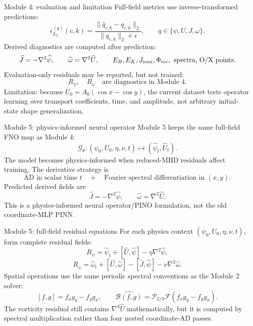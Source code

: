 \documentclass[aspectratio=169,11pt]{beamer}
\newcommand{\bracket}[2]{\left[#1,#2\right]}
\newcommand{\Rpsi}{R_{\psi}}
\newcommand{\Romega}{R_{\omega}}
\newcommand{\currentmodule}{Module 1}
\newcommand{\moduleprogress}{1 of 4}
\newcommand{\setmodule}[2]{%
  \renewcommand{\currentmodule}{#1}%
  \renewcommand{\moduleprogress}{#2}%
}
\begin{document}
\setmodule{Module 4}{4 of 4}
\begin{frame}[t]{Module 4: evaluation and limitation}
\vspace{-0.15em}
Full-field metrics use inverse-transformed predictions:
\[
\epsilon^{(q)}_{L_2}(c,k)=\frac{\|\widehat q_{c,k}-q_{c,k}\|_2}{\|q_{c,k}\|_2+\epsilon},
\qquad q\in\{\psi,U,J,\omega\}.
\]
Derived diagnostics are computed after prediction:
\[
\widehat J=-\nabla^2\widehat\psi,
\qquad
\widehat\omega=\nabla^2\widehat U,
\qquad
E_B,E_K,J_{\max},\Phi_{\rm rec},\text{ spectra, O/X points}.
\]
Evaluation-only residuals may be reported, but not trained:
\[
\Rpsi,\quad \Romega\quad\text{are diagnostics in Module 4.}
\]
Limitation: because $U_0=A_0(\cos x-\cos y)$, the current dataset tests operator learning over transport coefficients, time, and amplitude, not arbitrary initial-state shape generalization.
\end{frame}


\setmodule{Module 5}{1 of 4}
\begin{frame}[t]{Module 5: physics-informed neural operator}
\vspace{-0.15em}
Module 5 keeps the same full-field FNO map as Module 4:
\[
\mathcal G_\theta:(\psi_0,U_0,\eta,\nu,t)\mapsto(\widehat\psi_t,\widehat U_t).
\]
The model becomes physics-informed when reduced-MHD residuals affect training. The derivative strategy is
\[
\boxed{\text{AD in scalar time }t\quad+\quad\text{Fourier spectral differentiation in }(x,y).}
\]
Predicted derived fields are
\[
\widehat J=-\nabla^2\widehat\psi,
\qquad
\widehat\omega=\nabla^2\widehat U.
\]
This is a physics-informed neural operator/PINO formulation, not the old coordinate-MLP PINN.
\end{frame}

\setmodule{Module 5}{2 of 4}
\begin{frame}[t]{Module 5: full-field residual equations}
\vspace{-0.15em}
For each physics context $(\psi_0,U_0,\eta,\nu,t)$, form complete residual fields:
\[
\boxed{\Rpsi=\widehat\psi_t+\bracket{\widehat U}{\widehat\psi}-\eta\nabla^2\widehat\psi,}
\]
\[
\boxed{\Romega=\widehat\omega_t+\bracket{\widehat U}{\widehat\omega}
-\bracket{\widehat J}{\widehat\psi}-\nu\nabla^2\widehat\omega.}
\]
Spatial operations use the same periodic spectral conventions as the Module 2 solver:
\[
\bracket{f}{g}=f_xg_y-f_yg_x,
\qquad
\widehat{\mathcal B(f,g)}=\mathcal P_{2/3}\mathcal F(f_xg_y-f_yg_x).
\]
The vorticity residual still contains $\nabla^4\widehat U$ mathematically, but it is computed by spectral multiplication rather than four nested coordinate-AD passes.
\end{frame}
\end{document}
